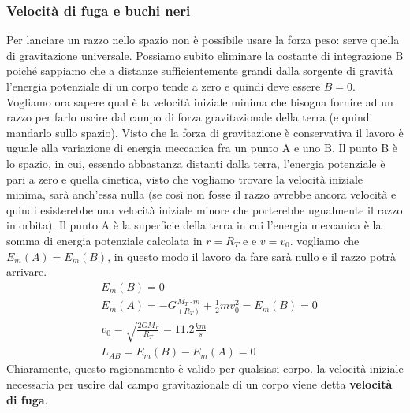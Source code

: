 \subsubsection{Velocità di fuga e buchi neri}
 Per lanciare un razzo nello spazio non è possibile usare la forza peso: serve quella di gravitazione universale. Possiamo subito eliminare la costante di integrazione B poiché sappiamo che a distanze sufficientemente grandi dalla sorgente di gravità l'energia potenziale di un corpo tende a zero e quindi deve essere $B=0$. Vogliamo ora sapere qual è la velocità iniziale minima che bisogna fornire ad un razzo per farlo uscire dal campo di forza gravitazionale della terra (e quindi mandarlo sullo spazio). Visto che la forza di gravitazione è conservativa il lavoro è uguale alla variazione di energia meccanica fra un punto A e uno B. Il punto B è lo spazio, in cui, essendo abbastanza distanti dalla terra, l'energia potenziale è pari a zero e quella cinetica, visto che vogliamo trovare la velocità iniziale minima, sarà anch'essa nulla (se così non fosse il razzo avrebbe ancora velocità e quindi esisterebbe una velocità iniziale minore che porterebbe ugualmente il razzo in orbita). Il punto A è la superficie della terra in cui l'energia meccanica è la somma di energia potenziale calcolata in $r =R_T$ e e $v = v_0$. vogliamo che $E_m(A) = E_m(B)$, in questo modo il lavoro da fare sarà nullo e il razzo potrà arrivare. 
 \begin{align*}
 &E_m(B) = 0\\
 &E_m(A) = -G\frac{M_T\cdot m}{(R_T)}+ \frac{1}{2}m v_0^2 = E_m(B) = 0\\
 &v_0 = \sqrt{\frac{2GM_T}{R_T}} = 11.2 \frac{km}{s}\\
 &L_{AB} = E_m(B)-E_m(A) = 0
 \end{align*}
Chiaramente, questo ragionamento è valido per qualsiasi corpo. la velocità iniziale necessaria per uscire dal campo gravitazionale di un corpo viene detta \textbf{velocità di fuga}.\\
